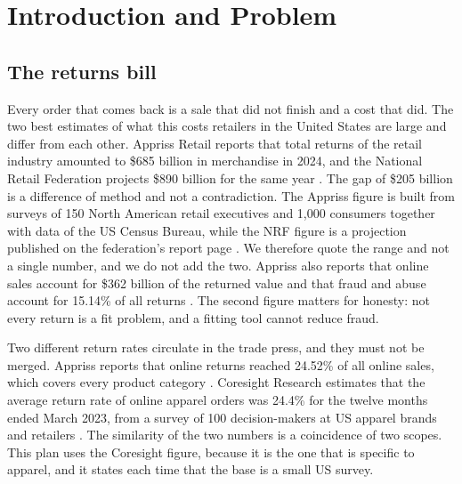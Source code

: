 \chapter{Introduction and Problem}\label{ch:intro}


\section{The returns bill}\label{sec:returns-bill}

Every order that comes back is a sale that did not finish and a cost that did. The two best estimates of what this costs retailers in the United States are large and differ from each other. Appriss Retail reports that total returns of the retail industry amounted to \$685 billion in merchandise in 2024, and the National Retail Federation projects \$890 billion for the same year \cite{appriss2024,nrf2024}. The gap of \$205 billion is a difference of method and not a contradiction. The Appriss figure is built from surveys of 150 North American retail executives and 1,000 consumers together with data of the US Census Bureau, while the NRF figure is a projection published on the federation's report page \cite{appriss2024,nrf2024}. We therefore quote the range and not a single number, and we do not add the two. Appriss also reports that online sales account for \$362 billion of the returned value and that fraud and abuse account for 15.14\% of all returns \cite{appriss2024}. The second figure matters for honesty: not every return is a fit problem, and a fitting tool cannot reduce fraud.

Two different return rates circulate in the trade press, and they must not be merged. Appriss reports that online returns reached 24.52\% of all online sales, which covers every product category \cite{appriss2024}. Coresight Research estimates that the average return rate of online apparel orders was 24.4\% for the twelve months ended March 2023, from a survey of 100 decision-makers at US apparel brands and retailers \cite{coresight2023}. The similarity of the two numbers is a coincidence of two scopes. This plan uses the Coresight figure, because it is the one that is specific to apparel, and it states each time that the base is a small US survey.


